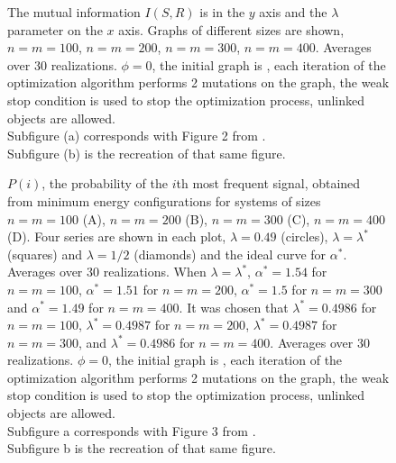 \begin{figure}
  \caption{
    The mutual information $I(S,R)$ is in the $y$ axis and the $\lambda$ parameter on the $x$ axis.
    Graphs of different sizes are shown, $n=m=100$, $n=m=200$, $n=m=300$, $n=m=400$.
    Averages over 30 realizations.
    $\phi=0$, the initial graph is , each iteration of the optimization algorithm performs 2 mutations on the graph, the weak stop condition is used to stop the optimization process, unlinked objects are allowed.\\
    Subfigure (a) corresponds with Figure 2 from \cite{Ferrer2005a}.\\
    Subfigure (b) is the recreation of that same figure.
  }
  \label{fig:fig2_2005}
\end{figure}

\begin{figure}
  \caption{
    $P(i)$, the probability of the $i$th most frequent signal, obtained from minimum energy configurations for systems of sizes $n=m=100$ (A), $n=m=200$ (B), $n=m=300$ (C), $n=m=400$ (D).
    Four series are shown in each plot, $\lambda=0.49$ (circles), $\lambda=\lambda^*$ (squares) and $\lambda=1/2$ (diamonds) and the ideal curve for $\alpha^*$.
    Averages over 30 realizations.
    When $\lambda=\lambda^*$, $\alpha^* = 1.54$ for $n=m=100$, $\alpha^* = 1.51$ for $n=m=200$, $\alpha^* = 1.5$ for $n=m=300$ and $\alpha^* = 1.49$ for $n=m=400$.
    It was chosen that $\lambda^* = 0.4986$ for $n=m=100$, $\lambda^* = 0.4987$ for $n=m=200$, $\lambda^* = 0.4987$ for $n=m=300$, and $\lambda^* = 0.4986$ for $n=m=400$.
    Averages over 30 realizations.
    $\phi=0$, the initial graph is , each iteration of the optimization algorithm performs 2 mutations on the graph, the weak stop condition is used to stop the optimization process, unlinked objects are allowed.\\
    Subfigure a corresponds with Figure 3 from \cite{Ferrer2005a}.\\
    Subfigure b is the recreation of that same figure.
  }
  \label{fig:fig3_2005}
\end{figure}

